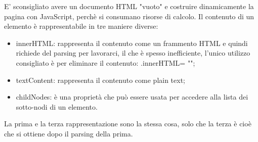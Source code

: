 \newline
E' sconsigliato avere un documento HTML "vuoto" e costruire dinamicamente la pagina con JavaScript, perchè si consumano risorse di calcolo.\newline
\newline
Il contenuto di un elemento è rappresentabile in tre maniere diverse:
\begin{itemize}
    \item innerHTML: rappresenta il contenuto come un frammento HTML e quindi richiede del parsing per lavorarci, il che è spesso inefficiente, l'unico utilizzo consigliato è per eliminare il contenuto: .innerHTML= "";
    \item textContent: rappresenta il contenuto come plain text;
    \item childNodes: è una proprietà che può essere usata per accedere alla lista dei sotto-nodi di un elemento.
\end{itemize}
La prima e la terza rappresentazione sono la stessa cosa, solo che la terza è cioè che si ottiene dopo il parsing della prima.\newline
\newline